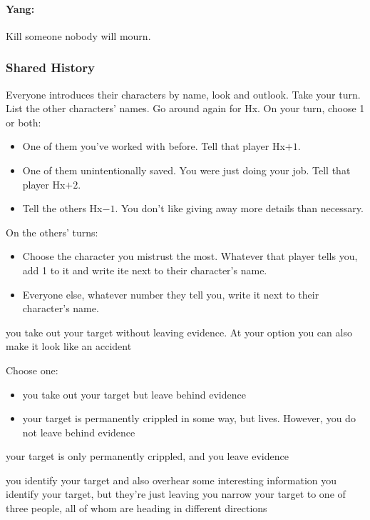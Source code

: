 \paragraph{Yang:} Kill someone nobody will mourn.

\subsubsection{Shared History}
Everyone introduces their characters by name, look and outlook. Take
your turn. List the other characters' names. Go around again for
Hx. On your turn, choose 1 or both:
\begin{itemize} %
\item One of them you've worked with before. Tell that player Hx$+1$.
\item One of them unintentionally saved. You were just doing your job. Tell that player Hx$+2$.
\item Tell the others Hx$-1$. You don't like giving away more details than necessary.
\end{itemize}
On the others’ turns:
\begin{itemize} %
\item Choose the character you mistrust the most. Whatever that player
  tells you, add 1 to it and write ite next to their character's name.
\item Everyone else, whatever number they tell you, write it next to
  their character’s name.
\end{itemize}

{you take out your target without leaving evidence. At your option you can also make it look like an accident}
{Choose one:
\begin{itemize}
\item you take out your target but leave behind evidence
\item your target is permanently crippled in some way, but lives. However, you do not leave behind evidence
\end{itemize}}
{your target is only permanently crippled, and you leave evidence}

{you identify your target and also overhear some interesting information}
{you identify your target, but they're just leaving}
{you narrow your target to one of three people, all of whom are heading in different directions}

